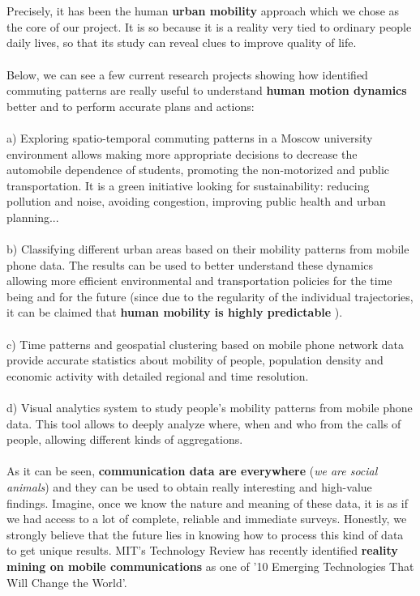 \\
\\
Precisely, it has been the human {\bf urban mobility } approach which we chose as the core of our project. It is so because it is a reality very tied to ordinary people daily lives, so that its study can reveal clues to improve quality of life.
\\
\\
Below, we can see a few current research projects showing how identified commuting patterns are really useful to understand {\bf human motion dynamics } better and to perform accurate plans and actions:
\\
\\
a) Exploring spatio-temporal commuting patterns in a Moscow university environment allows making more appropriate decisions to decrease the automobile dependence of students, promoting the non-motorized and public transportation. It is a green initiative looking for sustainability: reducing pollution and noise, avoiding congestion, improving public health and urban planning...
\\
\\
b) Classifying different urban areas based on their mobility patterns from mobile phone data. The results can be used to better understand these dynamics allowing more efficient environmental and transportation policies for the time being and for the future (since due to the regularity of the individual trajectories, it can be claimed that {\bf human mobility is highly predictable }).
\\
\\
c) Time patterns and geospatial clustering based on mobile phone network data provide accurate statistics about mobility of people, population density and economic activity with detailed regional and time resolution.
\\
\\
d) Visual analytics system to study people's mobility patterns from mobile phone data. This tool allows to deeply analyze where, when and who from the calls of  people, allowing different kinds of aggregations.
\\
\\
As it can be seen, {\bf communication data are everywhere} ({\it we are social animals}) and they can be used to obtain really interesting and high-value findings. Imagine, once we know the nature and meaning of these data, it is as if we had access to a lot of complete, reliable and immediate surveys. Honestly, we strongly believe that the future lies in knowing how to process this kind of data to get unique results. MIT's Technology Review has recently identified {\bf reality mining on mobile communications} as one of '10 Emerging Technologies That Will Change the World'.
